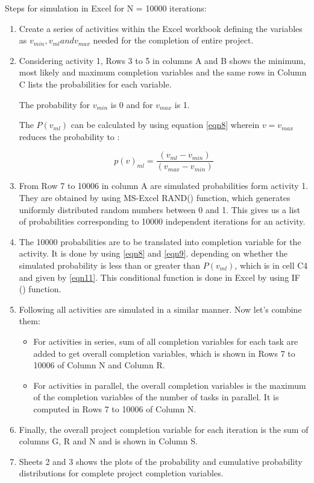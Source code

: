 Steps for simulation in Excel for N = 10000 iterations:
\begin{enumerate}
	\item Create a series of activities within the Excel workbook defining the variables as $v_ {min}, v_ {ml} and v_ {max}$ needed for the completion of entire project.
\item Considering activity 1, Rows 3 to 5 in columns A and B shows the minimum, most likely and maximum completion variables and the same rows in Column C lists the probabilities for each variable.

The probability for $v_{min}$ is 0 and for $v_{max}$ is 1. 

The $P(v_{ml})$ can be calculated by using equation \ref{eqn8} wherein $v = v_{max}$ reduces the probability to :

\begin{equation}
p(v)_{ml}  = \frac{(v_{ml} - v_{min})}{  (v_{max} - v_{min}) } 
\label{eqn12}
\end{equation}

\item From Row 7 to 10006 in column A are simulated probabilities form activity 1. They are obtained by using MS-Excel RAND() function, which generates uniformly distributed random numbers between 0 and 1. This gives us a list of probabilities corresponding to 10000 independent iterations for an activity.

\item The 10000 probabilities are to be translated into completion variable for the activity. It is done by using \ref{eqn8} and  \ref{eqn9}. depending on whether the simulated probability is less than or greater than $P (v_ {ml}) $, which is in cell C4 and given by \ref{eqn11}. This conditional function is done in Excel by using IF () function.
\item Following all activities are simulated in a similar manner. Now let’s combine them: 
\begin{itemize}
	\item For activities in series, sum of all completion variables for each task are added to get overall completion variables, which is shown in Rows 7 to 10006 of Column N and Column R.
	\item For activities in parallel, the overall completion variables is the maximum of the completion variables of the number of tasks in parallel. It is computed in Rows 7 to 10006 of Column N.
\end{itemize}
\item Finally, the overall project completion variable for each iteration is the sum of columns G, R and N and is shown in Column S.
\item Sheets 2 and 3 shows the plots of the probability and cumulative probability distributions for complete project completion variables.
\end{enumerate}

